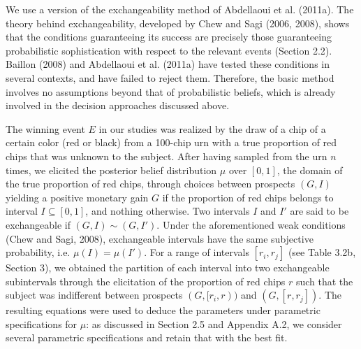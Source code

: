 \documentclass[12pt,a4paper]{article}
\newenvironment{original}
  {\par\vspace{0.5em}\noindent\color{black}\ignorespaces}
  {\par\vspace{0.3em}}
\begin{document}
\begin{original}
We use a version of the exchangeability method of Abdellaoui et al. (2011a). The theory behind exchangeability, developed by Chew and Sagi (2006, 2008), shows that the conditions guaranteeing its success are precisely those guaranteeing probabilistic sophistication with respect to the relevant events (Section 2.2). Baillon (2008) and Abdellaoui et al. (2011a) have tested these conditions in several contexts, and have failed to reject them. Therefore, the basic method involves no assumptions beyond that of probabilistic beliefs, which is already involved in the decision approaches discussed above.

The winning event $E$ in our studies was realized by the draw of a chip of a certain color (red or black) from a 100-chip urn with a true proportion of red chips that was unknown to the subject. After having sampled from the urn $n$ times, we elicited the posterior belief distribution $\mu$ over $[0, 1]$, the domain of the true proportion of red chips, through choices between prospects $(G, I)$ yielding a positive monetary gain $G$ if the proportion of red chips belongs to interval $I \subseteq [0, 1]$, and nothing otherwise. Two intervals $I$ and $I'$ are said to be exchangeable if $(G, I) \sim (G, I')$. Under the aforementioned weak conditions (Chew and Sagi, 2008), exchangeable intervals have the same subjective probability, i.e. $\mu(I) = \mu(I')$. For a range of intervals $[r_i, r_j]$ (see Table 3.2b, Section 3), we obtained the partition of each interval into two exchangeable subintervals through the elicitation of the proportion of red chips $r$ such that the subject was indifferent between prospects $(G, [r_i, r))$ and $(G, [r, r_j])$. The resulting equations were used to deduce the parameters under parametric specifications for $\mu$: as discussed in Section 2.5 and Appendix A.2, we consider several parametric specifications and retain that with the best fit.
\end{original}
\end{document}
